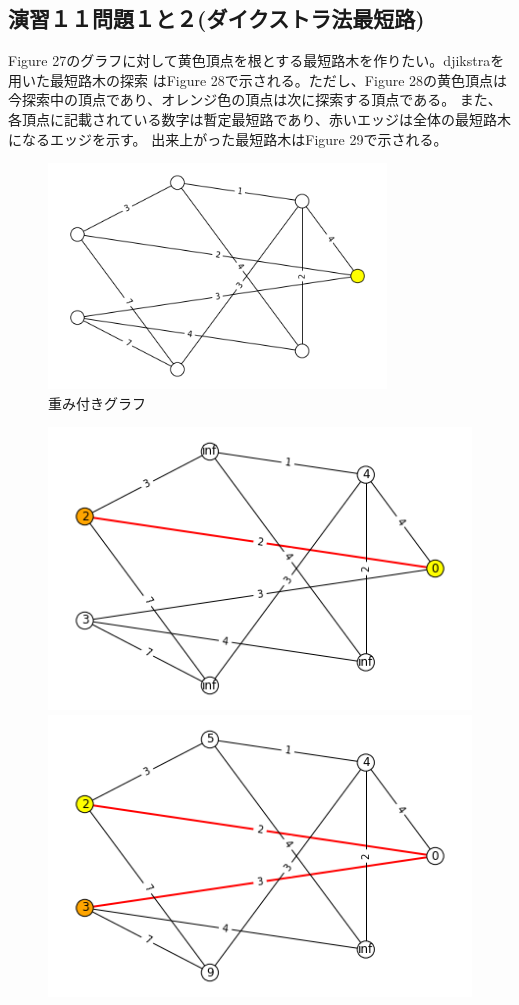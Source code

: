 \documentclass{report}
\begin{document}
\begin{CJK}{UTF8}{min}
    \clearpage
    \section*{演習１１問題１と２(ダイクストラ法最短路)}
    Figure 27のグラフに対して黄色頂点を根とする最短路木を作りたい。djikstraを用いた最短路木の探索
    はFigure 28で示される。ただし、Figure 28の黄色頂点は今探索中の頂点であり、オレンジ色の頂点は次に探索する頂点である。
    また、各頂点に記載されている数字は暫定最短路であり、赤いエッジは全体の最短路木になるエッジを示す。
    出来上がった最短路木はFigure 29で示される。
    \begin{figure}[!h]
        \centerline{\includegraphics[width=0.8\textwidth]{data/ex-11-start.png}}
        \caption{重み付きグラフ}
    \end{figure}
    \begin{figure}
        \includegraphics[width=.49\textwidth]{data/ex-11-D-1.png}\hfill
        \includegraphics[width=.49\textwidth]{data/ex-11-D-2.png}

\end{figure}
\end{CJK}
\end{document}
